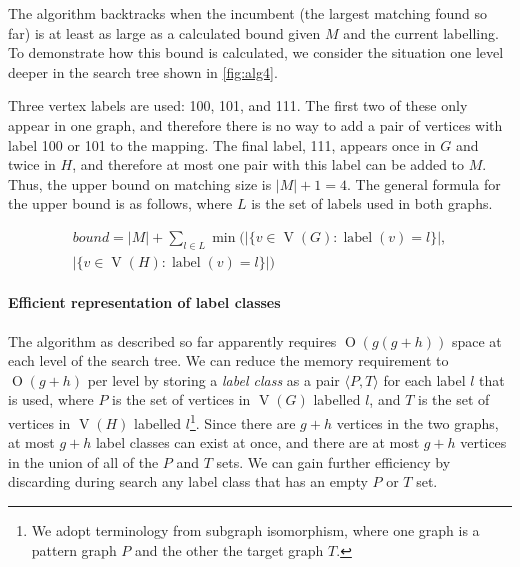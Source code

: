 \documentclass[letterpaper]{article}
\DeclareMathOperator{\V}{V}
\DeclareMathOperator{\vtxlabel}{label}
\newcommand{\BigO}[1]{\ensuremath{\operatorname{O}\left(#1\right)}}
\begin{document}
The algorithm backtracks when the incumbent (the largest matching found so far) is at least as large
as a calculated bound given $M$ and the current labelling. To demonstrate how
this bound is calculated, we consider the situation one level deeper in the
search tree shown in \cref{fig:alg4}.

Three vertex labels are used: 100,
101, and 111.  The first two of these only appear in one graph, and therefore
there is no way to add a pair of vertices with label 100 or 101 to the mapping.
The final label, 111, appears once in $G$ and twice in $H$, and therefore at
most one pair with this label can be added to $M$.  Thus, the upper bound on
matching size is $|M| + 1 = 4$. The general formula for the upper bound is
as follows, where $L$ is the set of labels used in both graphs.

\begin{multline*}
    \mathit{bound} = |M| + \sum_{l \in L} \min\big(|\{ v \in \V(G) : \vtxlabel(v)=l\}|, \\[-0.2cm]
        |\{ v \in \V(H) : \vtxlabel(v)=l \}|\big)
\end{multline*}



\paragraph{Efficient representation of label classes} The algorithm as
described so far apparently requires $\BigO{g(g+h)}$ space at each level of the
search tree.  We can reduce the memory requirement to $\BigO{g+h}$ per level by
storing a \emph{label class} as a pair $\langle P,T \rangle$ for each label $l$
that is used, where $P$ is the set of vertices in $\V(G)$ labelled $l$, and $T$
is the set of vertices in $\V(H)$ labelled $l$\footnote{We adopt terminology
from subgraph isomorphism, where one graph is a pattern graph $P$ and the other
the target graph $T$.}. Since there are $g + h$ vertices in the two graphs, at
most $g + h$ label classes can exist at once, and there are at most $g + h$
vertices in the union of all of the $P$ and $T$ sets.  We can gain further
efficiency by discarding during search any label class that has an empty $P$ or
$T$ set.
\end{document}
